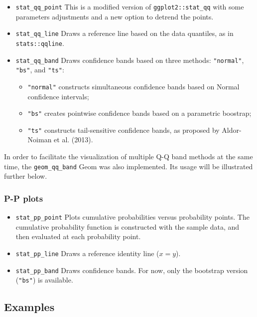 \begin{itemize}
\tightlist
\item
  \texttt{stat\_qq\_point} This is a modified version of
  \texttt{ggplot2::stat\_qq} with some parameters adjustments and a new
  option to detrend the points.
\item
  \texttt{stat\_qq\_line} Draws a reference line based on the data
  quantiles, as in \texttt{stats::qqline}.
\item
  \texttt{stat\_qq\_band} Draws confidence bands based on three methods:
  \texttt{"normal"}, \texttt{"bs"}, and \texttt{"ts"}:

  \begin{itemize}
  \tightlist
  \item
    \texttt{"normal"} constructs simultaneous confidence bands based on
    Normal confidence intervals;
  \item
    \texttt{"bs"} creates pointwise confidence bands based on a
    parametric boostrap;
  \item
    \texttt{"ts"} constructs tail-sensitive confidence bands, as
    proposed by Aldor-Noiman et al. (2013).
  \end{itemize}
\end{itemize}

In order to facilitate the visualization of multiple Q-Q band methods at
the same time, the \texttt{geom\_qq\_band} Geom was also implemented.
Its usage will be illustrated further below.

\subsubsection{P-P plots}\label{p-p-plots}

\begin{itemize}
\tightlist
\item
  \texttt{stat\_pp\_point} Plots cumulative probabilities versus
  probability points. The cumulative probability function is constructed
  with the sample data, and then evaluated at each probability point.
\item
  \texttt{stat\_pp\_line} Draws a reference identity line (\(x = y\)).
\item
  \texttt{stat\_pp\_band} Draws confidence bands. For now, only the
  bootstrap version (\texttt{"bs"}) is available.
\end{itemize}

\subsection{Examples}\label{examples}

